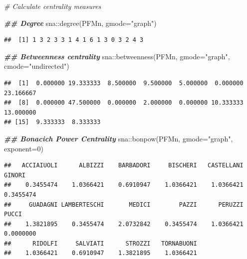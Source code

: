 \documentclass[
  notitlepage,
  onecolumn,
  openany]{book}
\newenvironment{Shaded}{\begin{snugshade}}{\end{snugshade}}
\newcommand{\AttributeTok}[1]{\textcolor[rgb]{0.77,0.63,0.00}{#1}}
\newcommand{\CommentTok}[1]{\textcolor[rgb]{0.56,0.35,0.01}{\textit{#1}}}
\newcommand{\DecValTok}[1]{\textcolor[rgb]{0.00,0.00,0.81}{#1}}
\newcommand{\DocumentationTok}[1]{\textcolor[rgb]{0.56,0.35,0.01}{\textbf{\textit{#1}}}}
\newcommand{\FunctionTok}[1]{\textcolor[rgb]{0.00,0.00,0.00}{#1}}
\newcommand{\NormalTok}[1]{#1}
\newcommand{\SpecialCharTok}[1]{\textcolor[rgb]{0.00,0.00,0.00}{#1}}
\newcommand{\StringTok}[1]{\textcolor[rgb]{0.31,0.60,0.02}{#1}}
\begin{document}
\begin{Shaded}
\begin{Highlighting}[]
\CommentTok{\# Calculate centrality measures}

\DocumentationTok{\#\# Degree}
\NormalTok{sna}\SpecialCharTok{::}\FunctionTok{degree}\NormalTok{(PFMn, }\AttributeTok{gmode=}\StringTok{"graph"}\NormalTok{)}
\end{Highlighting}
\end{Shaded}

\begin{verbatim}
##  [1] 1 3 2 3 3 1 4 1 6 1 3 0 3 2 4 3
\end{verbatim}

\begin{Shaded}
\begin{Highlighting}[]
\DocumentationTok{\#\# Betweenness centrality}
\NormalTok{sna}\SpecialCharTok{::}\FunctionTok{betweenness}\NormalTok{(PFMn, }\AttributeTok{gmode=}\StringTok{"graph"}\NormalTok{, }\AttributeTok{cmode=}\StringTok{"undirected"}\NormalTok{)}
\end{Highlighting}
\end{Shaded}

\begin{verbatim}
##  [1]  0.000000 19.333333  8.500000  9.500000  5.000000  0.000000 23.166667
##  [8]  0.000000 47.500000  0.000000  2.000000  0.000000 10.333333 13.000000
## [15]  9.333333  8.333333
\end{verbatim}

\begin{Shaded}
\begin{Highlighting}[]
\DocumentationTok{\#\# Bonacich Power Centrality}
\NormalTok{sna}\SpecialCharTok{::}\FunctionTok{bonpow}\NormalTok{(PFMn, }\AttributeTok{gmode=}\StringTok{"graph"}\NormalTok{, }\AttributeTok{exponent=}\DecValTok{0}\NormalTok{)}
\end{Highlighting}
\end{Shaded}

\begin{verbatim}
##   ACCIAIUOLI      ALBIZZI    BARBADORI     BISCHERI   CASTELLANI       GINORI 
##    0.3455474    1.0366421    0.6910947    1.0366421    1.0366421    0.3455474 
##     GUADAGNI LAMBERTESCHI       MEDICI        PAZZI      PERUZZI        PUCCI 
##    1.3821895    0.3455474    2.0732842    0.3455474    1.0366421    0.0000000 
##      RIDOLFI     SALVIATI      STROZZI   TORNABUONI 
##    1.0366421    0.6910947    1.3821895    1.0366421
\end{verbatim}
\end{document}
